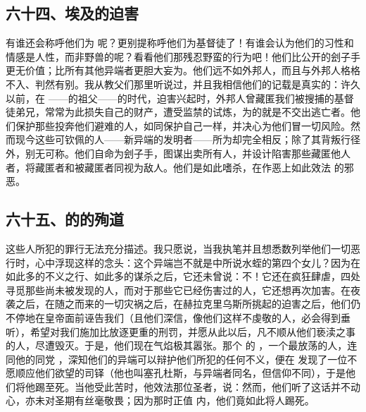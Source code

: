 \par


\subsection{六十四、埃及的迫害}

有谁还会称呼他们为  呢？更别提称呼他们为基督徒了！有谁会认为他们的习性和情感是人性，而非野兽的呢？看看他们那残忍野蛮的行为吧！他们比公开的刽子手更无价值；比所有其他异端者更胆大妄为。他们远不如外邦人，而且与外邦人格格不入、判然有别。我从教父们那里听说过，并且我相信他们的记载是真实的：许久以前，在 ——的祖父——的时代，迫害兴起时，外邦人曾藏匿我们被搜捕的基督徒弟兄，常常为此损失自己的财产，遭受监禁的试炼，为的就是不交出逃亡者。他们保护那些投奔他们避难的人，如同保护自己一样，并决心为他们冒一切风险。然而现今这些可钦佩的人——新异端的发明者——所为却完全相反；除了其背叛行径外，别无可称。他们自命为刽子手，图谋出卖所有人，并设计陷害那些藏匿他人者，将藏匿者和被藏匿者同视为敌人。他们是如此嗜杀，在作恶上如此效法 的邪恶。\par


\subsection{六十五、的的殉道}

这些人所犯的罪行无法充分描述。我只愿说，当我执笔并且想悉数列举他们一切恶行时，心中浮现这样的念头：这个异端岂不就是中所说水蛭的第四个女儿？因为在如此多的不义之行、如此多的谋杀之后，它还未曾说：不！它还在疯狂肆虐，四处寻觅那些尚未被发现的人，而对于那些它已经伤害过的人，它还想再次加害。在夜袭之后，在随之而来的一切灾祸之后，在赫拉克里乌斯所挑起的迫害之后，他们仍不停地在皇帝面前诬告我们（且他们深信，像他们这样不虔敬的人，必会得到垂听），希望对我们施加比放逐更重的刑罚，并愿从此以后，凡不顺从他们亵渎之事的人，尽遭毁灭。于是，他们现在气焰极其嚣张。那个 的 ，一个最放荡的人，连同他的同党 ，深知他们的异端可以辩护他们所犯的任何不义，便在 发现了一位不愿顺应他们欲望的司铎（他也叫塞孔杜斯，与异端者同名，但信仰不同），于是他们将他踢至死。当他受此苦时，他效法那位圣者，说：然而，他们听了这话并不动心，亦未对圣期有丝毫敬畏；因为那时正值 内，他们竟如此将人踢死。\par

